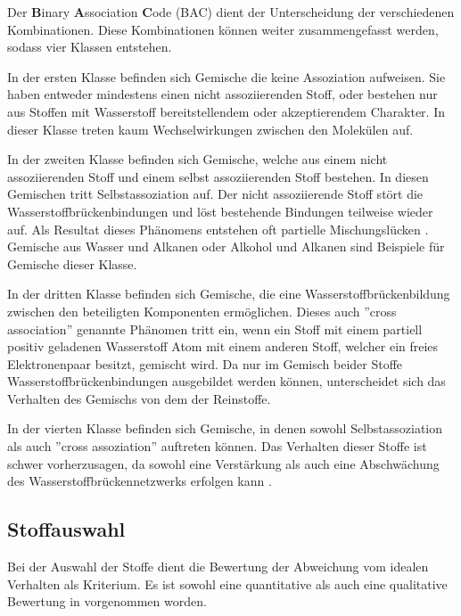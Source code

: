 \documentclass[../thesis.tex]{subfiles}
\begin{document}
Der \textbf{B}inary \textbf{A}ssociation \textbf{C}ode (BAC) dient der Unterscheidung der verschiedenen Kombinationen. Diese Kombinationen können weiter zusammengefasst werden, sodass vier Klassen entstehen.

In der ersten Klasse befinden sich Gemische die keine Assoziation aufweisen. Sie haben entweder mindestens einen nicht assoziierenden Stoff, oder bestehen nur aus Stoffen mit Wasserstoff bereitstellendem oder akzeptierendem Charakter. In dieser Klasse treten kaum Wechselwirkungen zwischen den Molekülen auf.

In der zweiten Klasse befinden sich Gemische, welche aus einem nicht assoziierenden Stoff und einem selbst assoziierenden Stoff bestehen. In diesen Gemischen tritt Selbstassoziation auf. Der nicht assoziierende Stoff stört die Wasserstoffbrückenbindungen und löst bestehende Bindungen teilweise wieder auf. Als Resultat dieses Phänomens entstehen oft partielle Mischungslücken \cite{jaubert2020benchmark}. Gemische aus Wasser und Alkanen oder Alkohol und Alkanen sind Beispiele für Gemische dieser Klasse.

In der dritten Klasse befinden sich Gemische, die eine Wasserstoffbrückenbildung zwischen den beteiligten Komponenten ermöglichen. Dieses auch ''cross association'' genannte Phänomen tritt ein, wenn ein Stoff mit einem partiell positiv geladenen Wasserstoff Atom mit einem anderen Stoff, welcher ein freies Elektronenpaar besitzt, gemischt wird. Da nur im Gemisch beider Stoffe Wasserstoffbrückenbindungen ausgebildet werden können, unterscheidet sich das Verhalten des Gemischs von dem der Reinstoffe.

In der vierten Klasse befinden sich Gemische, in denen sowohl Selbstassoziation als auch ''cross assoziation'' auftreten können. Das Verhalten dieser Stoffe ist schwer vorherzusagen, da sowohl eine Verstärkung als auch eine Abschwächung des Wasserstoffbrückennetzwerks erfolgen kann \cite{jaubert2020benchmark}.

\subsection{Stoffauswahl}

Bei der Auswahl der Stoffe dient die Bewertung der Abweichung vom idealen Verhalten als Kriterium. Es ist sowohl eine quantitative als auch eine qualitative Bewertung in \cite{jaubert2020benchmark} vorgenommen worden.
\end{document}
